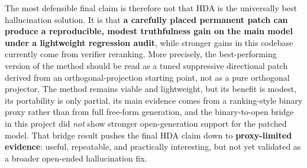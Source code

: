 \documentclass{article}
\begin{document}
The most defensible final claim is therefore not that HDA is the universally best hallucination solution. It is that \textbf{a carefully placed permanent patch can produce a reproducible, modest truthfulness gain on the main model under a lightweight regression audit}, while stronger gains in this codebase currently come from verifier reranking. More precisely, the best-performing version of the method should be read as a tuned suppressive directional patch derived from an orthogonal-projection starting point, not as a pure orthogonal projector. The method remains viable and lightweight, but its benefit is modest, its portability is only partial, its main evidence comes from a ranking-style binary proxy rather than from full free-form generation, and the binary-to-open bridge in this project did \emph{not} show stronger open-generation support for the patched model. That bridge result pushes the final HDA claim down to \textbf{proxy-limited evidence}: useful, repeatable, and practically interesting, but not yet validated as a broader open-ended hallucination fix.
\end{document}
